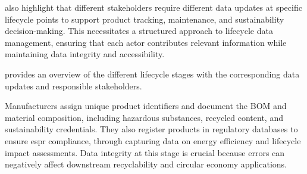 \textcite{Jensen.2023} also highlight that different stakeholders require different data updates at specific lifecycle points to support product tracking, maintenance, and sustainability decision-making. This necessitates a structured approach to lifecycle data management, ensuring that each actor contributes relevant information while maintaining data integrity and accessibility.

 provides an overview of the different lifecycle stages with the corresponding data updates and responsible stakeholders.

\begin{table}[htbp]
    \centering
    \caption{\ac{dpp} Data Updates Across Lifecycle Stages}
    \label{tab:dpp_lifecycle_stages}
\end{table}

Manufacturers assign unique product identifiers and document the BOM and material composition, including hazardous substances, recycled content, and sustainability credentials. They also register products in regulatory databases to ensure \ac{espr} compliance, through capturing data on energy efficiency and lifecycle impact assessments. Data integrity at this stage is crucial because errors can negatively affect downstream recyclability and circular economy applications. \autocite{EuropeanParliamentandCouncil.2024, Jensen.2023, Kuhn.2025}

